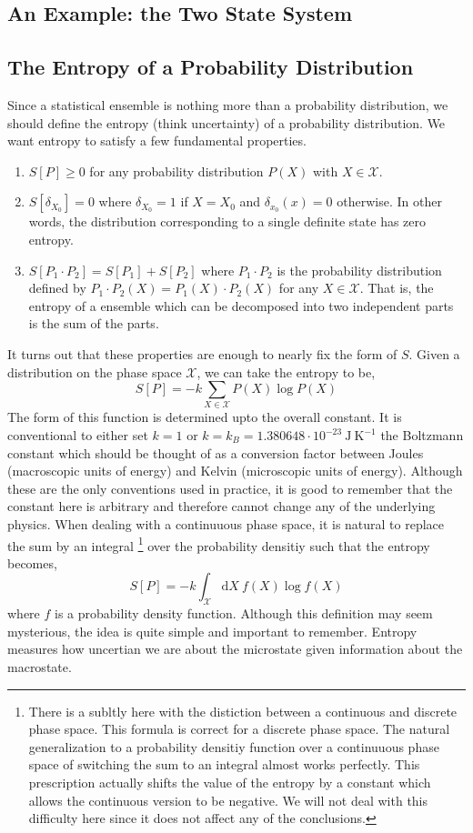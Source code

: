 \documentclass[11pt,a4paper]{article}
\renewcommand{\d}[1]{\mathrm{d}#1}
\theoremstyle{theorem}
\theoremstyle{definition}
\theoremstyle{definition}
\theoremstyle{remark}
\theoremstyle{definition}
\theoremstyle{remark}
\newcommand{\phase}{\mathscr{X}}
\begin{document}
\subsection{An Example: the Two State System}

\subsection{The Entropy of a Probability Distribution}

Since a statistical ensemble is nothing more than a probability distribution, we should define the entropy (think uncertainty) of a probability distribution. We want entropy to satisfy a few fundamental properties. 
\begin{enumerate}
\item $S[P] \ge 0$ for any probability distribution $P(X)$ with $X \in \phase$.

\item $S[\delta_{X_0}] = 0$ where $\delta_{X_0} = 1$ if $X = X_0$ and $\delta_{x_0}(x) = 0$ otherwise. In other words, the distribution corresponding to a single definite state has zero entropy.

\item $S[P_1 \cdot P_2] = S[P_1] + S[P_2]$ where $P_1 \cdot P_2$ is the probability distribution defined by $P_1 \cdot P_2 (X) = P_1(X) \cdot P_2(X)$ for any $X \in \phase$. That is, the entropy of a ensemble which can be decomposed into two independent parts is the sum of the parts.  
\end{enumerate}
It turns out that these properties are enough to nearly fix the form of $S$. Given a distribution on the phase space $\phase$, we can take the entropy to be,
\[ S[P] = - k \sum_{X \in \phase} P(X) \log{P(X)} \]
The form of this function is determined upto the overall constant. It is conventional to either set $k = 1$ or $k = k_B = 1.380648 \cdot 10^{-23} \: \mathrm{J} \: \mathrm{K}^{-1}$ the Boltzmann constant which should be thought of as a conversion factor between Joules (macroscopic units of energy) and Kelvin (microscopic units of energy). Although these are the only conventions used in practice, it is good to remember that the constant here is arbitrary and therefore cannot change any of the underlying physics. 
When dealing with a continuuous phase space, it is natural to replace the sum by an integral \footnote{There is a subltly here with the distiction between a continuous and discrete phase space. This formula is correct for a discrete phase space. The natural generalization to a probability densitiy function over a continuuous phase space of switching the sum to an integral almost works perfectly. This prescription actually shifts the value of the entropy by a constant which allows the continuous version to be negative. We will not deal with this difficulty here since it does not affect any of the conclusions.} over the probability densitiy such that the entropy becomes,
\[ S[P] = -k \int_{\phase} \d{X} \: f(X) \log{f(X)} \]
where $f$ is a probability density function.
Although this definition may seem mysterious, the idea is quite simple and important to remember. Entropy measures how uncertian we are about the microstate given information about the macrostate.
\end{document}
